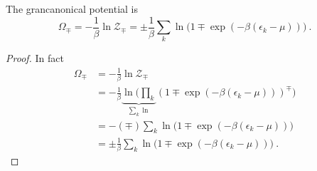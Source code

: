     The grancanonical potential is 
    \begin{equation*}
        \Omega_\mp = -\frac{1}{\beta} \ln \mathcal Z_\mp = \pm \frac{1}{\beta} \sum_k \ln \Big (1 \mp \exp (-\beta (\epsilon_k - \mu)) \Big) ~.
    \end{equation*}
    \begin{proof}
        In fact 
        \begin{equation*}
        \begin{aligned}
            \Omega_\mp & = -\frac{1}{\beta} \ln \mathcal Z_\mp \\ & = - \frac{1}{\beta} \underbrace{\ln \Big (\prod_k}_{\sum_k \ln} ( 1 \mp \exp(- \beta (\epsilon_k - \mu) ))^\mp \Big ) \\ & = - (\mp) \sum_k \ln \Big (1 \mp \exp (-\beta (\epsilon_k - \mu))) \\ & = \pm \frac{1}{\beta} \sum_k \ln \Big (1 \mp \exp (-\beta (\epsilon_k - \mu)) \Big) ~.
        \end{aligned}
        \end{equation*}
    \end{proof}

